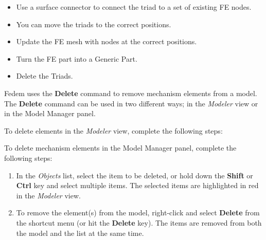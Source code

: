 \begin{itemize}
\item
  Use a surface connector to connect the triad to a set of existing FE nodes.
\item
  You can move the triads to the correct positions.
\item
  Update the FE mesh with nodes at the correct positions.
\item
  Turn the FE part into a Generic Part.
\item
  Delete the Triads.
\end{itemize}



Fedem uses the \textbf{Delete} command to remove mechanism elements from
a model. The \textbf{Delete} command can be used in two different ways;
in the {\sl Modeler} view or in the Model Manager panel.



To delete elements in the {\sl Modeler} view, complete the following steps:

\vskip14mm




To delete mechanism elements in the Model Manager panel,
complete the following steps:

\begin{enumerate} \setlength\itemsep{1em}
\item
  In the {\sl Objects} list, select the item to be deleted, or hold down the
  \textbf{Shift} or \textbf{Ctrl} key and select multiple items.
  The selected items are highlighted in red in the {\sl Modeler} view.


  \vspace*{-3mm}
\item
  To remove the element(s) from the model, right-click and select
  \textbf{Delete} from the shortcut menu (or hit the \textbf{Delete} key).
  The items are removed from both the model and the list at the same time.
\end{enumerate}

